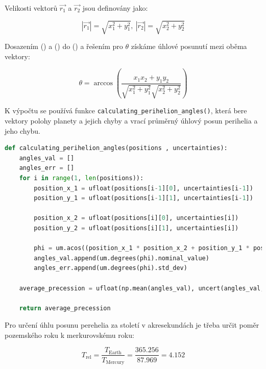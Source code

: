 \documentclass[a4paper,11pt,twocolumn]{article}
\begin{document}
            Velikosti vektorů $\vec{r_1}$ a $\vec{r_2}$ jsou definovány jako:

            \begin{equation}
                    |\vec{r_1}| = \sqrt{x_1^2 + y_1^2}, ~|\vec{r_2}| = \sqrt{x_2^2 + y_2^2}
                \label{eq:mag}
            \end{equation}

            Dosazením () a () do () a řešením pro $\theta$ získáme úhlové posunutí mezi oběma vektory:

            \begin{equation}
                \theta = \arccos{\left(\frac{x_1 x_2 + y_1 y_2}{\sqrt{x_1^2 + y_1^2} \sqrt{x_2^2 + y_2^2}}\right)}
                \label{eq:theta}
            \end{equation}

            K výpočtu se používá funkce \texttt{calculating\_perihelion\_angles()}, která bere vektory polohy planety a jejich chyby a vrací průměrný úhlový posun perihelia a jeho chybu. 

\begin{lstlisting}[language=Python, caption={Výpočet úhlového posunu perihelia}]
def calculating_perihelion_angles(positions , uncertainties):
    angles_val = []
    angles_err = []
    for i in range(1, len(positions)):
        position_x_1 = ufloat(positions[i-1][0], uncertainties[i-1])
        position_y_1 = ufloat(positions[i-1][1], uncertainties[i-1])

        position_x_2 = ufloat(positions[i][0], uncertainties[i])
        position_y_2 = ufloat(positions[i][1], uncertainties[i])

        phi = um.acos((position_x_1 * position_x_2 + position_y_1 * position_y_2) / (um.sqrt(position_x_1**2 + position_y_1**2) * um.sqrt(position_x_2**2 + position_y_2**2)))
        angles_val.append(um.degrees(phi).nominal_value)
        angles_err.append(um.degrees(phi).std_dev)

    average_precession = ufloat(np.mean(angles_val), uncert(angles_val, np.mean(angles_err)))

    return average_precession
\end{lstlisting}

            Pro určení úhlu posunu perehelia za století v akresekundách je třeba určit poměr pozemského roku k merkurovskému roku:

            \begin{equation*}
                T_{\text{rel}} = \frac{T_{\text{Earth}}}{T_{\text{Mercury}}} = \frac{365.256}{87.969} = 4.152
            \end{equation*}
\end{document}
